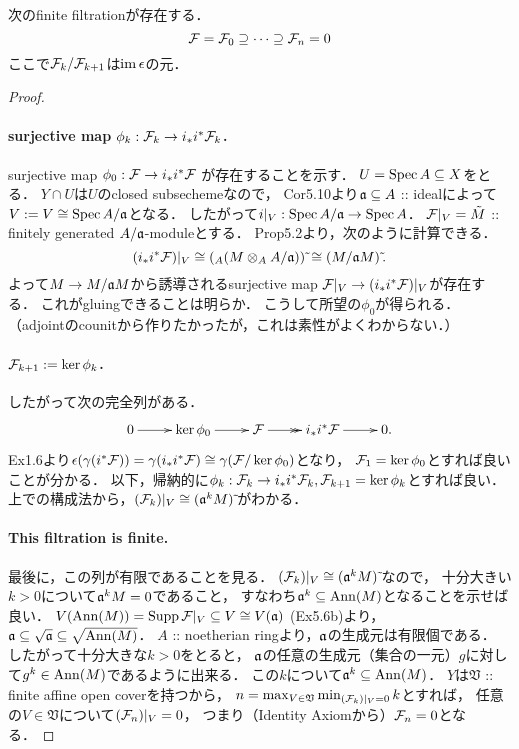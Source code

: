 \documentclass[a4paper]{jsarticle}
\newcommand{\coverV}{\mathfrak{V}}
\begin{document}
    \begin{Claim}
        次のfinite filtrationが存在する．
        \[ \mathcal{F}=\mathcal{F}_0 \supseteq \cdots \supseteq \mathcal{F}_n=0 \]
        ここで$\mathcal{F}_k/\mathcal{F}_{k+1}$は$\operatorname{im} \epsilon$の元．
    \end{Claim}
    \begin{proof}
        \paragraph{surjective map $\phi_k: \mathcal{F}_k \to i_* i^* \mathcal{F}_k$.}
        surjective map $\phi_0: \mathcal{F} \to i_* i^* \mathcal{F}$ が存在することを示す．
        $U=\operatorname{Spec} A \subseteq X$をとる．
        $Y \cap U$は$U$のclosed subsechemeなので，
        Cor5.10より$\mathfrak{a} \subseteq A$ :: idealによって
        $V:=V \cong \operatorname{Spec} A/\mathfrak{a}$となる．
        したがって$i|_{V}: \operatorname{Spec} A/\mathfrak{a} \to \operatorname{Spec} A$．
        $\mathcal{F}|_{V}=\tilde{M}$ :: finitely generated $A/\mathfrak{a}$-moduleとする．
        Prop5.2より，次のように計算できる．
        \[ (i_* i^* \mathcal{F})|_{V} \cong ({}_A(M \otimes_A A/\mathfrak{a}))\,\tilde{} \cong (M/\mathfrak{a}M) \,\tilde{}. \]
        よって$M \to M/\mathfrak{a}M$から誘導されるsurjective map
        $\mathcal{F}|_{V} \to (i_* i^* \mathcal{F})|_{V}$が存在する．
        これがgluingできることは明らか．
        こうして所望の$\phi_0$が得られる．
        （adjointのcounitから作りたかったが，これは素性がよくわからない．）

        \paragraph{$\mathcal{F}_{k+1}:=\ker \phi_k$.}
        したがって次の完全列がある．
        \[
            \xymatrix
            {
                0 \ar[r]& \ker \phi_0 \ar[r]& \shF \ar@{->>}[r]& i_*i^* \shF \ar[r]& 0.
            }
        \]
        Ex1.6より$\epsilon(\gamma(i^* \mathcal{F}))=\gamma(i_* i^* \mathcal{F}) \cong \gamma(\mathcal{F}/\ker \phi_0)$となり，
        $\mathcal{F}_1=\ker \phi_0$とすれば良いことが分かる．
        以下，帰納的に$\phi_k: \mathcal{F}_k \to i_* i^* \mathcal{F}_k, \mathcal{F}_{k+1}=\ker \phi_k$とすれば良い．
        上での構成法から，$(\mathcal{F}_{k})|_{V} \cong (\mathfrak{a}^{k} M)\,\tilde{}$がわかる．

        \paragraph{This filtration is finite.}
        最後に，この列が有限であることを見る．
        $(\mathcal{F}_{k})|_{V} \cong (\mathfrak{a}^{k} M)\,\tilde{}$なので，
        十分大きい$k>0$について$\mathfrak{a}^{k} M=0$であること，
        すなわち$\mathfrak{a}^k \subseteq \operatorname{Ann}(M)$となることを示せば良い．
        $V(\operatorname{Ann}(M))=\operatorname{Supp} \mathcal{F}|_{V} \subseteq V \cong V(\mathfrak{a})$ (Ex5.6b)より，
        $\mathfrak{a} \subseteq \sqrt{\mathfrak{a}} \subseteq \sqrt{\operatorname{Ann}(M)}$．
        $A$ :: noetherian ringより，$\mathfrak{a}$の生成元は有限個である．
        したがって十分大きな$k>0$をとると，
        $\mathfrak{a}$の任意の生成元（集合の一元）$g$に対して$g^k \in \operatorname{Ann}(M)$であるように出来る．
        この$k$について$\mathfrak{a}^k \subseteq \operatorname{Ann}(M)$．
        $Y$は$\coverV$ :: finite affine open coverを持つから，
        $n=\max_{V \in \coverV} \min_{(\shF_k)|_V=0} k$とすれば，
        任意の$V \in \coverV$について$(\mathcal{F}_n)|_V=0$，
        つまり（Identity Axiomから）$\mathcal{F}_n=0$となる．
    \end{proof}
\end{document}
